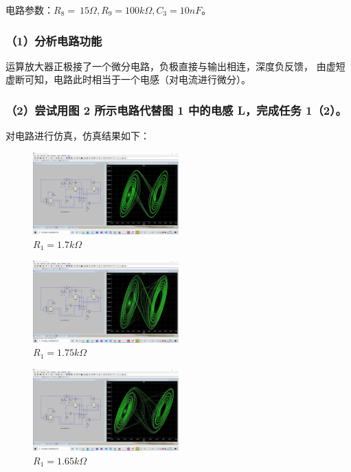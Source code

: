 \documentclass[UTF8]{ctexart}
\begin{document}
电路参数：$R_8 = ~15\Omega, R_9=100k \Omega, C_3=10nF$。

\subsubsection*{（1）分析电路功能}

运算放大器正极接了一个微分电路，负极直接与输出相连，深度负反馈，
由虚短虚断可知，电路此时相当于一个电感（对电流进行微分）。


\subsubsection*{（2）尝试用图 2 所示电路代替图 1 中的电感 L，完成任务 1（2）。}

对电路进行仿真，仿真结果如下：
\begin{figure}[H]
        \centering
        \includegraphics*[width = 0.5\textwidth]{2-2-1.7k.jpg}
        \caption{$R_1 = 1.7k\Omega$}
\end{figure}
\begin{figure}[H]
        \centering
        \includegraphics*[width = 0.5\textwidth]{2-2-1.75k.jpg}
        \caption{$R_1 = 1.75k\Omega$}
\end{figure}
\begin{figure}[H]
        \centering
        \includegraphics*[width = 0.5\textwidth]{2-2-1.65k.jpg}
        \caption{$R_1 = 1.65k\Omega$}
\end{figure}
\end{document}
